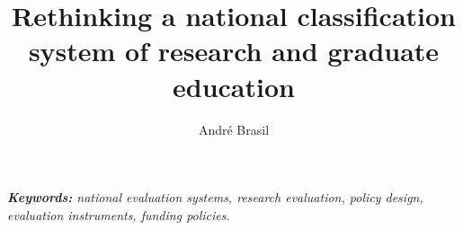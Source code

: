 \documentclass[a4paper, 12pt]{article}
\title{Rethinking a national classification system of research and graduate education}
\author[1,2]{André Brasil}%
\affil[1]{\glsxtrfull{cwts}, \glsxtrlong{lu}}
\date{\vspace{-1em}}
\begin{document}
\clearpage\maketitle
\thispagestyle{empty}

{\renewcommand{\baselinestretch}{1.2}
\begin{abstract}
\vspace{2pt}
\footnotesize\noindent
\end{abstract}
}

\begin{center}
\vspace{5pt}\noindent\footnotesize\textit{\textbf{Keywords:} national evaluation systems, research evaluation, 
policy design, \\evaluation instruments, funding policies.}
\end{center}
\newpage




{%
\renewcommand{\bibfont}{\normalfont\footnotesize}
\setlength{\biblabelsep}{0pt}
\raggedright\printbibliography
}
\end{document}
